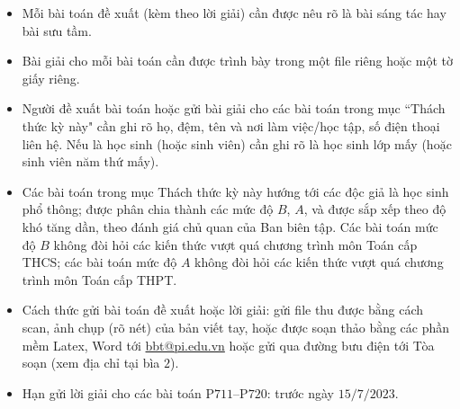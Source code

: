 \thispagestyle{thachthuctoanhocnone}
\pagestyle{thachthuctoanhoc}
\everymath{\color{thachthuctoanhoc}}
\graphicspath{{../thachthuctoanhoc/pic/}}
\begingroup
{}
\centering
\vspace*{4cm}
\endgroup
\vspace*{-8pt}
\begin{tBox}
	\begin{itemize}[leftmargin = 13pt, itemsep = 1.0pt] 
		\item Mỗi bài toán đề xuất (kèm theo lời giải) cần được nêu rõ là bài sáng tác hay bài sưu tầm.
		\item Bài giải cho mỗi bài toán cần được trình bày trong một file riêng hoặc
		một tờ giấy riêng.
		\item  Người đề xuất bài toán hoặc gửi bài giải cho các bài toán trong mục ``Thách thức kỳ này" cần ghi rõ họ, đệm, tên và nơi làm việc/học tập, số điện thoại liên hệ. Nếu là học sinh (hoặc sinh viên) cần ghi rõ là học sinh lớp mấy (hoặc sinh viên năm thứ mấy).
		\item Các bài toán trong mục Thách thức kỳ này hướng tới các độc giả là học sinh phổ thông; được phân chia thành các mức độ $B$, $A$, và được sắp xếp theo độ khó tăng dần, theo đánh giá chủ quan của Ban biên tập. Các bài toán mức độ $B$ không đòi hỏi các kiến thức vượt quá chương trình môn Toán cấp THCS; các bài toán mức độ $A$ không đòi hỏi các kiến thức vượt quá chương trình môn Toán cấp THPT.
		\item Cách thức gửi bài toán đề xuất hoặc lời giải: gửi file thu được bằng cách scan, ảnh chụp (rõ nét) của bản viết tay, hoặc được soạn thảo bằng các phần mềm Latex, Word tới \url{bbt@pi.edu.vn} hoặc gửi qua đường bưu điện tới Tòa soạn (xem địa chỉ tại bìa $2$).
		\item Hạn gửi lời giải cho các bài toán P$711$--P$720$: trước ngày $15/7/2023$.
	\end{itemize}
\end{tBox}
